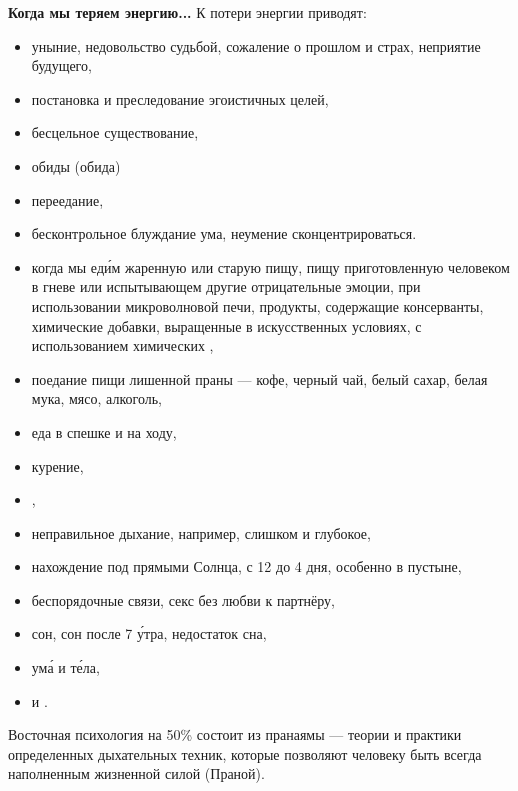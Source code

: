 \textbf{Когда мы теряем энергию...}
К потери энергии приводят:
\begin{itemize}[noitemsep, label=--]
    \item уныние, недовольство судьбой, сожаление о прошлом и страх, неприятие будущего,
    \item  постановка и преследование эгоистичных целей,
    \item бесцельное существование,
    \item обиды (обида)
    \item переедание,
    \item бесконтрольное блуждание ума, неумение сконцентрироваться.
    \item когда мы ед\'{и}м жаренную или старую пищу, пищу приготовленную человеком в гневе или испытывающем другие отрицательные эмоции, при использовании микроволновой печи, продукты, содержащие консерванты, химические добавки, выращенные в искусственных условиях, с использованием химических ,
    \item поедание пищи лишенной праны --- кофе, черный чай, белый сахар, белая мука, мясо, алкоголь,
    \item еда в спешке и на ходу,
    \item курение,
    \item {},
    \item неправильное дыхание, например, слишком  и глубокое,
    \item нахождение под прямыми  Солнца, с 12 до 4 дня, особенно в пустыне,
    \item беспорядочные  связи, секс без любви к партнёру,
    \item {} сон, сон после 7 \'{у}тра, недостаток сна,
    \item {} ум\'{а} и т\'{е}ла,
    \item {} и .
\end{itemize}

Восточная психология на 50\% состоит из пранаямы --- теории и практики определенных дыхательных техник, которые позволяют человеку быть всегда наполненным жизненной силой (Праной).


